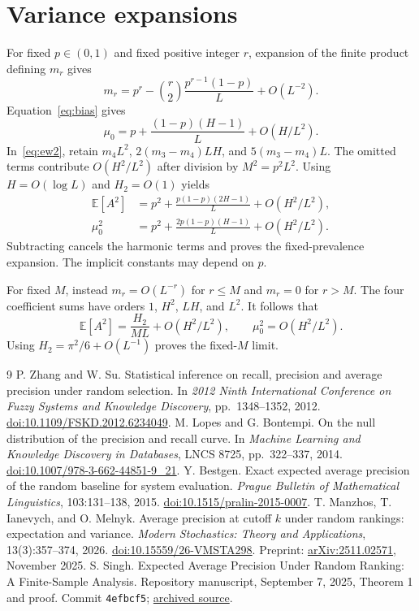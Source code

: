 \documentclass[10pt]{article}
\newcommand{\E}{\mathbb{E}}
\begin{document}
\section{Variance expansions}\label{app:asymptotic}
For fixed $p\in(0,1)$ and fixed positive integer $r$, expansion of the finite product defining $m_r$ gives
\[
 m_r=p^r-\binom r2\frac{p^{r-1}(1-p)}L+O(L^{-2}).
\]
Equation~\eqref{eq:bias} gives
\[
 \mu_0=p+\frac{(1-p)(H-1)}L+O(H/L^2).
\]
In~\eqref{eq:ew2}, retain $m_4L^2$, $2(m_3-m_4)LH$, and $5(m_3-m_4)L$.
The omitted terms contribute $O(H^2/L^2)$ after division by $M^2=p^2L^2$.
Using $H=O(\log L)$ and $H_2=O(1)$ yields
\begin{align*}
 \E[A^2]&=p^2+\frac{p(1-p)(2H-1)}L+O(H^2/L^2),\\
 \mu_0^2&=p^2+\frac{2p(1-p)(H-1)}L+O(H^2/L^2).
\end{align*}
Subtracting cancels the harmonic terms and proves the fixed-prevalence expansion.
The implicit constants may depend on $p$.

For fixed $M$, instead $m_r=O(L^{-r})$ for $r\le M$ and $m_r=0$ for $r>M$.
The four coefficient sums have orders $1$, $H^2$, $LH$, and $L^2$.
It follows that
\[
 \E[A^2]=\frac{H_2}{ML}+O(H^2/L^2),\qquad
 \mu_0^2=O(H^2/L^2).
\]
Using $H_2=\pi^2/6+O(L^{-1})$ proves the fixed-$M$ limit.

\begin{thebibliography}{9}
 P. Zhang and W. Su.
Statistical inference on recall, precision and average precision under random selection.
In \emph{2012 Ninth International Conference on Fuzzy Systems and Knowledge Discovery}, pp.~1348--1352, 2012.
\href{https://doi.org/10.1109/FSKD.2012.6234049}{doi:10.1109/FSKD.2012.6234049}.
 M. Lopes and G. Bontempi.
On the null distribution of the precision and recall curve.
In \emph{Machine Learning and Knowledge Discovery in Databases}, LNCS 8725, pp.~322--337, 2014.
\href{https://doi.org/10.1007/978-3-662-44851-9_21}{doi:10.1007/978-3-662-44851-9\_21}.
 Y. Bestgen.
Exact expected average precision of the random baseline for system evaluation.
\emph{Prague Bulletin of Mathematical Linguistics}, 103:131--138, 2015.
\href{https://doi.org/10.1515/pralin-2015-0007}{doi:10.1515/pralin-2015-0007}.
 T. Manzhos, T. Ianevych, and O. Melnyk.
Average precision at cutoff $k$ under random rankings: expectation and variance.
\emph{Modern Stochastics: Theory and Applications}, 13(3):357--374, 2026.
\href{https://doi.org/10.15559/26-VMSTA298}{doi:10.15559/26-VMSTA298}.
Preprint: \href{https://arxiv.org/abs/2511.02571}{arXiv:2511.02571}, November 2025.
 S. Singh.
Expected Average Precision Under Random Ranking: A Finite-Sample Analysis.
Repository manuscript, September 7, 2025, Theorem 1 and proof.
Commit \texttt{4efbcf5}; \href{https://github.com/shntnu/expected_ap/blob/4efbcf57d0d28a158dcbbe52872847d8e21ba130/expected_ap.md}{archived source}.
\end{thebibliography}
\end{document}
